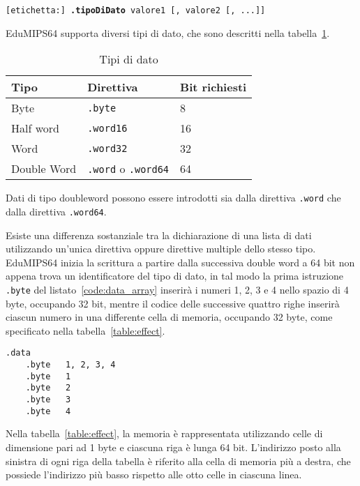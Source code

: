 \documentclass[12pt]{report}
\newcommand{\EM}{EduMIPS64}
\begin{document}
\begin{center}
	\texttt{[etichetta:] \textbf{.tipoDiDato} valore1 [, valore2 [, ...]]}
\end{center}

\EM{} supporta diversi tipi di dato, che sono descritti nella tabella~\ref{table:datatypes}.

\begin{table}[!htb]
	\begin{centering}
		\begin{tabular}{lll}
			\hline
			\hline
			Tipo & Direttiva & Bit richiesti\\
			\hline
			Byte & \texttt{.byte} & 8\\
			Half word & \texttt{.word16} & 16\\
			Word & \texttt{.word32} & 32\\
			Double Word & \texttt{.word} o \texttt{.word64} & 64
		\end{tabular}
		\caption{Tipi di dato}
		\label{table:datatypes}
	\end{centering}
\end{table}

Dati di tipo doubleword possono essere introdotti sia dalla direttiva
\texttt{.word} che dalla direttiva \texttt{.word64}.

 Esiste una differenza sostanziale tra la dichiarazione di una lista di dati 
utilizzando un'unica direttiva oppure direttive multiple dello stesso tipo.
\EM{} inizia la scrittura a partire dalla successiva double word a 64 bit non appena 
trova un identificatore del tipo di dato, in tal modo la prima istruzione \texttt{.byte} 
del listato~\ref{code:data_array} inserir\`{a} i numeri 1, 2, 3 e 4 nello spazio di 4 byte, 
occupando 32 bit, mentre il codice delle successive quattro righe inserir\`{a} ciascun numero 
in una differente cella di memoria, occupando 32 byte, come specificato nella tabella~\ref{table:effect}.

\begin{lstlisting}[caption={Byte adiacenti}, label={code:data_array}, style={mips}]
	.data
	.byte	1, 2, 3, 4
	.byte	1
	.byte	2
	.byte	3
	.byte	4
\end{lstlisting}

Nella tabella~\ref{table:effect}, la memoria \`{e} rappresentata utilizzando celle di dimensione pari 
ad 1 byte e ciascuna riga \`{e} lunga 64 bit. L'indirizzo posto alla sinistra di ogni riga della tabella \`{e} 
riferito alla cella di memoria pi\`{u} a destra, che possiede l'indirizzo pi\`{u} basso rispetto alle otto celle in ciascuna linea.
\end{document}
